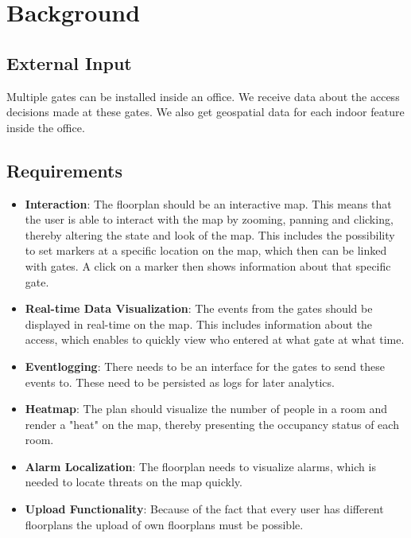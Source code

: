 \section{Background}

\subsection{External Input}

Multiple gates can be installed inside an office. We receive data about the access decisions made at these gates. We also get geospatial data for each indoor feature inside the office.

\subsection{Requirements}

\begin{itemize}
	\item \textbf{Interaction}:
	The floorplan should be an interactive map. This means that the user is able to interact with the map by zooming, panning and clicking, thereby altering the state and look of the map. This includes the possibility to set markers at a specific location on the map, which then can be linked with gates. A click on a marker then shows information about that specific gate.
	\item \textbf{Real-time Data Visualization}:
	 The events from the gates should be displayed in real-time on the map. This includes information about the access, which enables to quickly view who entered at what gate at what time.
	\item \textbf{Eventlogging}:
	There needs to be an interface for the gates to send these events to. These need to be persisted as logs for later analytics.
	\item \textbf{Heatmap}:
	The plan should visualize the number of people in a room and render a "heat" on the map, thereby presenting the occupancy status of each room.
	\item \textbf{Alarm Localization}:
	The floorplan needs to visualize alarms, which is needed to locate threats on the map quickly.
	\item \textbf{Upload Functionality}:
	Because of the fact that every user has different floorplans the upload of own floorplans must be possible.
\end{itemize}

\clearpage